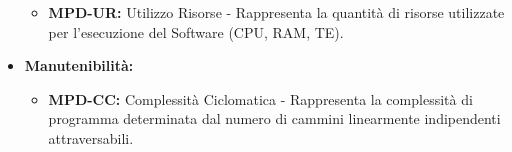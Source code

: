 \documentclass[8pt]{article}
\newcommand{\signatureline}[1]{%
	 \par\vspace{0.5cm}
	\noindent\makebox[\linewidth][r]{\rule{0.2\textwidth}{0.5pt}\hspace{3cm}\makebox[0pt][r]{\vspace{3pt}\footnotesize #1}}%
}
\begin{document}
\begin{itemize}
\begin{itemize}
            \item \textbf{MPD-UR:} Utilizzo Risorse - Rappresenta la quantità di risorse utilizzate per l'esecuzione del Software (CPU, RAM, TE).
        \end{itemize}
    \item \textbf{Manutenibilità:}
        \begin{itemize}
            \item \textbf{MPD-CC:} Complessità Ciclomatica - Rappresenta la complessità di programma determinata dal numero di cammini linearmente indipendenti attraversabili.
        \end{itemize}
\end{itemize}

\end{document}
